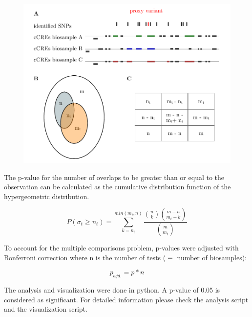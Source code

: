 \begin{figure}[h]
\capstart
    \centering
    \includegraphics{Abbildung/enrichment.pdf}

    \begin{minipage}{\captionwidth}
        \caption[enrichment]{}
        \label{fig:enrichment}
    \end{minipage}
\end{figure}

The p-value for the number of overlaps to be greater than or equal to the observation can be calculated as the cumulative distribution function of the hypergeometric distribution.

$$ P(\sigma_t\geq n_t) = \sum_{k=n_t}^{min(m_t, n)} \frac{\binom{n}{k}\binom{m-n}{m_t-k}}{\binom{m}{m_t}} $$

To account for the multiple comparisons problem, p-values were adjusted with Bonferroni correction where n is the number of tests ($\equiv$ number of biosamples):

$$ p_{ajd.} = p*n$$

The analysis and visualization were done in python. A p-value of 0.05 is considered as significant. For detailed information please check the analysis script and the visualization script.
